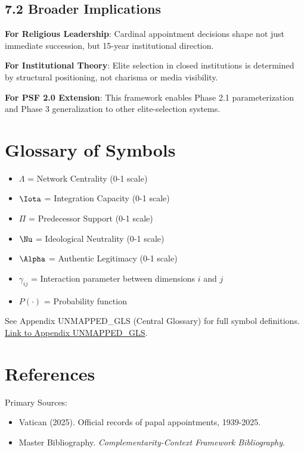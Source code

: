 \subsection{7.2 Broader Implications}

\textbf{For Religious Leadership}: Cardinal appointment decisions shape not just immediate succession, but 15-year institutional direction.

\textbf{For Institutional Theory}: Elite selection in closed institutions is determined by structural positioning, not charisma or media visibility.

\textbf{For PSF 2.0 Extension}: This framework enables Phase 2.1 parameterization and Phase 3 generalization to other elite-selection systems.

\section*{Glossary of Symbols}

\begin{itemize}
\item $\Lambda$ = Network Centrality (0-1 scale)
\item $\Iota$ = Integration Capacity (0-1 scale)
\item $\Pi$ = Predecessor Support (0-1 scale)
\item $\Nu$ = Ideological Neutrality (0-1 scale)
\item $\Alpha$ = Authentic Legitimacy (0-1 scale)
\item $\gamma_{ij}$ = Interaction parameter between dimensions $i$ and $j$
\item $P(\cdot)$ = Probability function
\end{itemize}

See Appendix UNMAPPED_GLS (Central Glossary) for full symbol definitions. \href{https://github.com/FehrAdvice-Partners-AG/complementarity-context-framework/appendices/G_glossary.tex}{Link to Appendix UNMAPPED_GLS}.

\section*{References}

\noindent
Primary Sources:
\begin{itemize}
\item Vatican (2025). Official records of papal appointments, 1939-2025.
\item \nocite{bcm_master} Master Bibliography. \textit{Complementarity-Context Framework Bibliography}.
\end{itemize}

